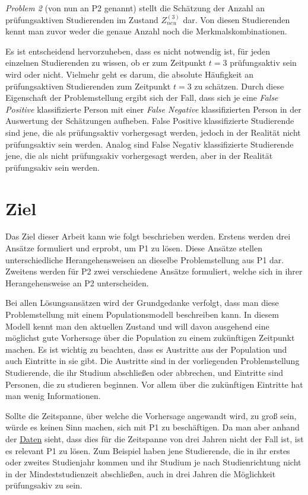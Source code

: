 \textit{Problem 2} (von nun an P2 genannt) stellt die Sch\"atzung der Anzahl an pr\"ufungsaktiven Studierenden im Zustand $Z_{neu}^{(3)}$ dar. Von diesen
Studierenden kennt man zuvor weder die genaue Anzahl noch die Merkmalskombinationen.

Es ist entscheidend hervorzuheben, dass es nicht notwendig ist, f\"ur jeden einzelnen Studierenden zu wissen, ob er
zum Zeitpunkt $t = 3$  pr\"ufungsaktiv sein wird oder nicht. Vielmehr geht es darum, die absolute H\"aufigkeit an pr\"ufungsaktiven
Studierenden zum Zeitpunkt $t = 3$ zu sch\"atzen. Durch diese Eigenschaft der Problemstellung ergibt sich der Fall,
dass sich je eine \textit{False Positive} klassifizierte Person mit einer
\textit{False Negative} klassifizierten Person in der Auswertung der Sch\"atzungen aufheben. False Positive klassifizierte Studierende sind jene, die
als pr\"ufungsaktiv vorhergesagt werden, jedoch in der Realit\"at nicht pr\"ufungsaktiv sein werden. Analog sind False Negativ klassifizierte Studierende jene, die
als nicht pr\"ufungsakiv  vorhergesagt werden, aber in der Realit\"at pr\"ufungsakiv sein werden.



\section{Ziel}
Das Ziel dieser Arbeit kann wie folgt beschrieben werden. Erstens werden drei Ans\"atze formuliert und erprobt,
um P1 zu l\"osen. Diese Ans\"atze stellen unterschiedliche Herangehensweisen an dieselbe Problemstellung aus P1 dar.
Zweitens werden f\"ur P2 zwei verschiedene Ans\"atze formuliert, welche sich in ihrer Herangehensweise an P2 unterscheiden.

Bei allen L\"osungsans\"atzen wird der Grundgedanke verfolgt, dass man diese Problemstellung mit einem Populationsmodell beschreiben kann.
In diesem Modell kennt man den aktuellen Zustand und will davon ausgehend eine m\"oglichst gute Vorhersage \"uber die Population zu einem zuk\"unftigen
Zeitpunkt machen. Es ist wichtig zu beachten, dass es Austritte aus der Population und auch Eintritte in sie gibt. Die Austritte sind in der vorliegenden Problemstellung
Studierende, die ihr Studium abschlie{\ss}en oder abbrechen, und Eintritte sind Personen, die zu studieren beginnen. Vor allem \"uber die zuk\"unftigen Eintritte
hat man wenig Informationen.

Sollte die Zeitspanne, \"uber welche die Vorhersage angewandt wird, zu gro{\ss} sein, w\"urde es keinen Sinn machen, sich mit P1 zu besch\"aftigen.
Da man aber anhand der \hyperref[sec:daten]{Daten} sieht, dass dies f\"ur
die Zeitspanne von drei Jahren nicht der Fall ist, ist es relevant P1 zu l\"osen. Zum Beispiel haben jene Studierende, die in ihr erstes oder zweites Studienjahr kommen und ihr Studium je nach Studienrichtung
nicht in der Mindeststudienzeit abschlie{\ss}en, auch in drei Jahren die M\"oglichkeit pr\"ufungsakiv zu sein.

